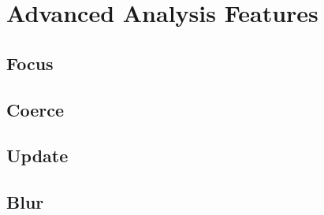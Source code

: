 \section{Advanced Analysis Features}
\label{Se:TVLA_Analysis}


\subsection{Focus}

\subsection{Coerce}

\subsection{Update}

\subsection{Blur}
